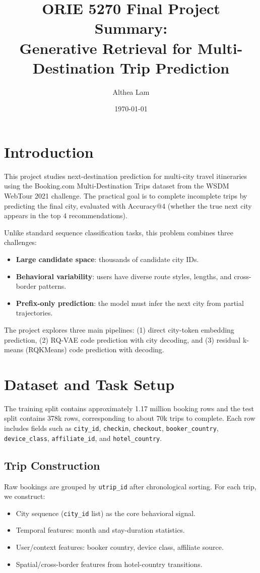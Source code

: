 \documentclass[11pt]{article}
\title{ORIE 5270 Final Project Summary:\\Generative Retrieval for Multi-Destination Trip Prediction}
\author{Althea Lam}
\date{\today}
\begin{document}
\maketitle
\onehalfspacing

\section{Introduction}
This project studies next-destination prediction for multi-city travel itineraries using the Booking.com Multi-Destination Trips dataset from the WSDM WebTour 2021 challenge. The practical goal is to complete incomplete trips by predicting the final city, evaluated with Accuracy@4 (whether the true next city appears in the top 4 recommendations).

Unlike standard sequence classification tasks, this problem combines three challenges:
\begin{itemize}[leftmargin=1.5em]
    \item \textbf{Large candidate space}: thousands of candidate city IDs.
    \item \textbf{Behavioral variability}: users have diverse route styles, lengths, and cross-border patterns.
    \item \textbf{Prefix-only prediction}: the model must infer the next city from partial trajectories.
\end{itemize}

The project explores three main pipelines: (1) direct city-token embedding prediction, (2) RQ-VAE code prediction with city decoding, and (3) residual k-means (RQKMeans) code prediction with decoding.

\section{Dataset and Task Setup}
The training split contains approximately 1.17 million booking rows and the test split contains 378k rows, corresponding to about 70k trips to complete. Each row includes fields such as \texttt{city\_id}, \texttt{checkin}, \texttt{checkout}, \texttt{booker\_country}, \texttt{device\_class}, \texttt{affiliate\_id}, and \texttt{hotel\_country}.

\subsection{Trip Construction}
Raw bookings are grouped by \texttt{utrip\_id} after chronological sorting. For each trip, we construct:
\begin{itemize}[leftmargin=1.5em]
    \item City sequence (\texttt{city\_id} list) as the core behavioral signal.
    \item Temporal features: month and stay-duration statistics.
    \item User/context features: booker country, device class, affiliate source.
    \item Spatial/cross-border features from hotel-country transitions.
\end{itemize}
\end{document}
